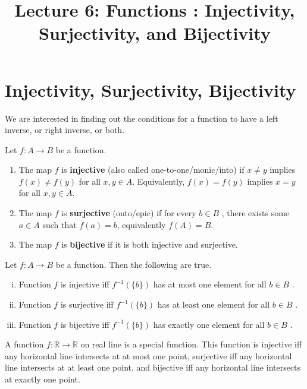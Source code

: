 \documentclass[a4paper,english,12pt]{article}   	%
\title{Lecture 6: Functions : Injectivity, Surjectivity, and Bijectivity}
\author{}
\begin{document}
\maketitle

\section {Injectivity, Surjectivity, Bijectivity}
We are interested in finding out the conditions for a function to have a left inverse, or right inverse, or both.
\begin{defn} Let $ f \colon A \to B $ be a function.
\begin{enumerate} 
	\item The map $f$ is \textbf{injective} (also called one-to-one/monic/into) if $x \neq y $ implies $f(x) \neq f(y) $ for all $x,y \in A$. Equivalently, $f(x) = f(y) $ implies $x = y $ for all $x,y \in A$.
	\item The map $f$ is \textbf{surjective} (onto/epic) if for every $b \in B$ , there exists some $a \in A $ such that $f(a)=b$, equivalently $f(A)=B$.
 \item The map $f$ is \textbf{bijective} if it is both injective and surjective.
\end{enumerate}
\end{defn}
\begin{lem} Let $f: A \to B$ be a function. Then the following are true.
\begin{enumerate}[i)]
	\item Function $f$ is injective iff $ f^{-1}(\{b\})$ has at most one element for all $b \in B$ .
	\item Function $f$ is surjective iff $ f^{-1}(\{b\})$ has at least one element for all $b \in B$ .
	\item Function $f$ is bijective iff $ f^{-1}(\{b\})$ has exactly one element for all $b \in B$ .
\end{enumerate}
\end{lem}
\begin{exmp}
A function $f \colon \mathbb{R} \to \mathbb{R}$ on real line is a special function.  This function is injective iff any horizontal line intersects at at most one point, surjective iff any horizontal line intersects at at least one point, and bijective iff any horizontal line intersects at exactly one point.
\end{exmp}
\end{document}
